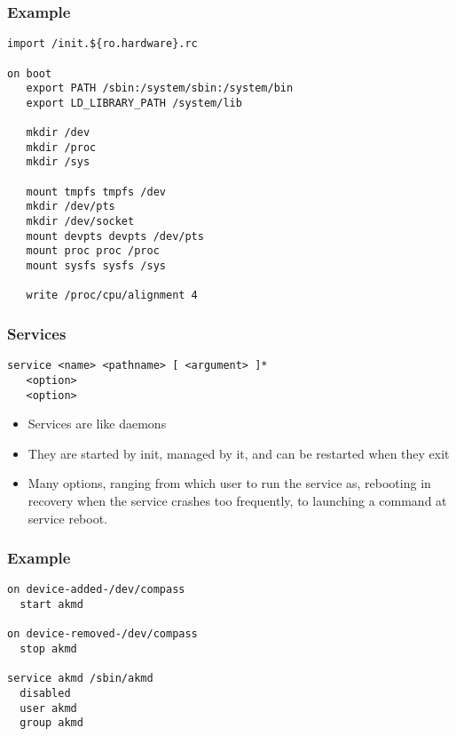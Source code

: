 \begin{frame}[fragile]
  \frametitle{Example}
\begin{verbatim}
import /init.${ro.hardware}.rc

on boot
   export PATH /sbin:/system/sbin:/system/bin
   export LD_LIBRARY_PATH /system/lib

   mkdir /dev
   mkdir /proc
   mkdir /sys

   mount tmpfs tmpfs /dev
   mkdir /dev/pts
   mkdir /dev/socket
   mount devpts devpts /dev/pts
   mount proc proc /proc
   mount sysfs sysfs /sys

   write /proc/cpu/alignment 4
\end{verbatim}
\end{frame}

\begin{frame}[fragile]
  \frametitle{Services}
\begin{verbatim}
service <name> <pathname> [ <argument> ]*
   <option>
   <option>
\end{verbatim}
  \begin{itemize}
  \item Services are like daemons
  \item They are started by init, managed by it, and can be restarted
    when they exit
  \item Many options, ranging from which user to run the service as,
    rebooting in recovery when the service crashes too frequently, to
    launching a command at service reboot.
  \end{itemize}
\end{frame}

\begin{frame}[fragile]
  \frametitle{Example}
\begin{verbatim}
on device-added-/dev/compass
  start akmd

on device-removed-/dev/compass
  stop akmd

service akmd /sbin/akmd
  disabled
  user akmd
  group akmd
\end{verbatim}
\end{frame}

